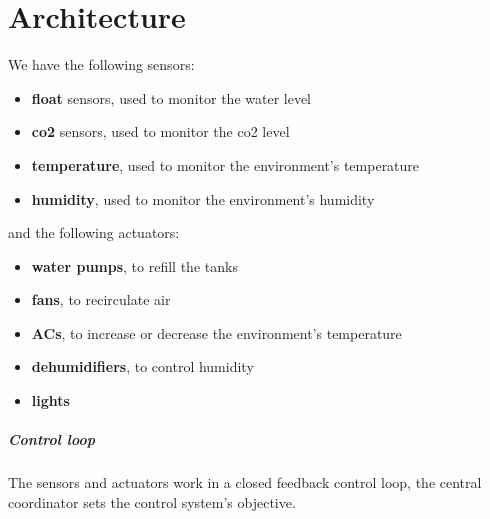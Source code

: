 \documentclass[parskip=full]{report}
\begin{document}
\chapter{Architecture}

We have the following sensors:

\begin{itemize}
	\item \textbf{float} sensors, used to monitor the water level
	\item \textbf{co2} sensors, used to monitor the co2 level
	\item \textbf{temperature}, used to monitor the environment's temperature
	\item \textbf{humidity}, used to monitor the environment's humidity
\end{itemize}

and the following actuators:

\begin{itemize}
	\item \textbf{water pumps}, to refill the tanks
	\item \textbf{fans}, to recirculate air
	\item \textbf{ACs}, to increase or decrease the environment's temperature
	\item \textbf{dehumidifiers}, to control humidity
	\item \textbf{lights}
\end{itemize}

\paragraph{Control loop}
The sensors and actuators work in a closed feedback control loop, the central coordinator sets the control system's objective.

\end{document}
